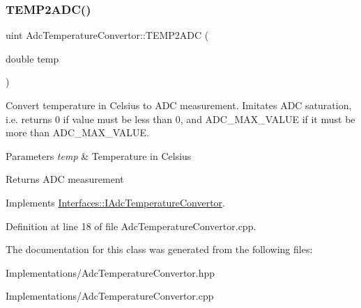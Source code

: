 \mbox{\label{class_adc_temperature_convertor_ae82f374826a431c837bdf796c593775b}} 
\subsubsection{\texorpdfstring{T\+E\+M\+P2\+A\+D\+C()}{TEMP2ADC()}}
{\footnotesize\ttfamily uint Adc\+Temperature\+Convertor\+::\+T\+E\+M\+P2\+A\+DC (\begin{DoxyParamCaption}\item[{double}]{temp }\end{DoxyParamCaption})\hspace{0.3cm}{\ttfamily [virtual]}}



Convert temperature in Celsius to A\+DC measurement. Imitates A\+DC saturation, i.\+e. returns 0 if value must be less than 0, and A\+D\+C\+\_\+\+M\+A\+X\+\_\+\+V\+A\+L\+UE if it must be more than A\+D\+C\+\_\+\+M\+A\+X\+\_\+\+V\+A\+L\+UE. 


\begin{DoxyParams}{Parameters}
{\em temp} & Temperature in Celsius \\
\hline
\end{DoxyParams}
\begin{DoxyReturn}{Returns}
A\+DC measurement 
\end{DoxyReturn}


Implements \hyperlink{class_interfaces_1_1_i_adc_temperature_convertor_ab5d3453ecc41848b723a790fe7e01f79}{Interfaces\+::\+I\+Adc\+Temperature\+Convertor}.



Definition at line 18 of file Adc\+Temperature\+Convertor.\+cpp.



The documentation for this class was generated from the following files\+:\begin{DoxyCompactItemize}
\item 
Implementations/Adc\+Temperature\+Convertor.\+hpp\item 
Implementations/Adc\+Temperature\+Convertor.\+cpp\end{DoxyCompactItemize}
